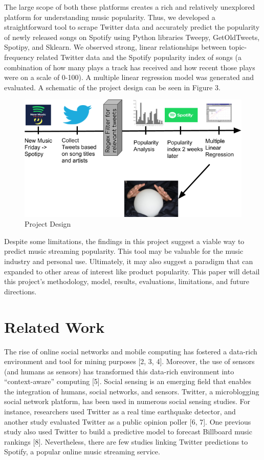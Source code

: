 \documentclass[12pt,conference]{IEEEtran}
\begin{document}
The large scope of both these platforms creates a rich and relatively unexplored platform for understanding music popularity. Thus, we developed a straightforward tool to scrape Twitter data and accurately predict the popularity of newly released songs on Spotify using Python libraries Tweepy, GetOldTweets, Spotipy, and Sklearn. We observed strong, linear relationships between topic-frequency related Twitter data and the Spotify popularity index of songs (a combination of how many plays a track has received and how recent those plays were on a scale of 0-100). A multiple linear regression model was generated and evaluated. A schematic of the project design can be seen in Figure 3. \par

\begin{figure}[h!]
  \includegraphics[scale=0.40]{design.png}
  \caption{Project Design}
  \label{fig:birds}
\end{figure}

Despite some limitations, the findings in this project suggest a viable way to predict music streaming popularity. This tool may be valuable for the music industry and personal use. Ultimately, it may also suggest a paradigm that can expanded to other areas of interest like product popularity. This paper will detail this project's methodology, model, results, evaluations, limitations, and future directions. \par

\section{Related Work}
The rise of online social networks and mobile computing has fostered a data-rich environment and tool for mining purposes [2, 3, 4]. Moreover, the use of sensors (and humans as sensors) has transformed this data-rich environment into “context-aware” computing [5]. Social sensing is an emerging field that enables the integration of humans, social networks, and sensors. Twitter, a microblogging social network platform, has been used in numerous social sensing studies. For instance, researchers used Twitter as a real time earthquake detector, and another study evaluated Twitter as a public opinion poller [6, 7]. One previous study also used Twitter to build a predictive model to forecast Billboard music rankings [8]. Nevertheless, there are few studies linking Twitter predictions to Spotify, a popular online music streaming service. \par
\end{document}
